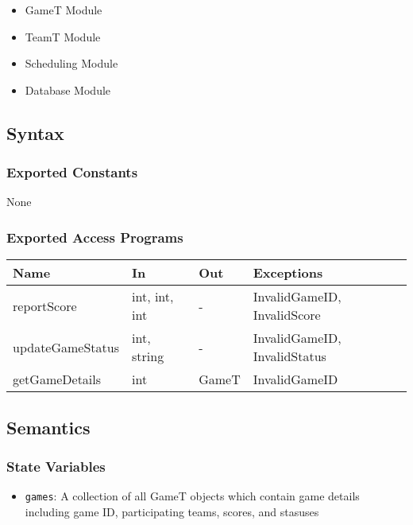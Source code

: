 \documentclass[12pt, titlepage]{article}
\begin{document}
\begin{itemize}
  \item GameT Module
  \item TeamT Module
  \item Scheduling Module
  \item Database Module
\end{itemize}

\subsection{Syntax}

\subsubsection{Exported Constants}

None

\subsubsection{Exported Access Programs}

\begin{center}
\begin{tabularx}{\textwidth}{|l|X|X|X|}
\hline
\textbf{Name}    & \textbf{In}   & \textbf{Out} & \textbf{Exceptions}          \\
\hline
reportScore      & int, int, int & -     & InvalidGameID, InvalidScore  \\
\hline
updateGameStatus & int, string   & -      & InvalidGameID, InvalidStatus \\
\hline
getGameDetails   & int           & GameT        & InvalidGameID                \\
\hline
\end{tabularx}
\end{center}

\subsection{Semantics}

\subsubsection{State Variables}

\begin{itemize}
  \item \texttt{games}: A collection of all GameT objects which contain game details including game ID, participating teams, scores, and stasuses
\end{itemize}
\end{document}
